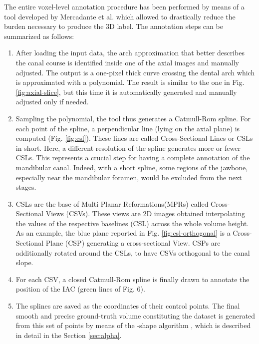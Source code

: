 The entire voxel-level annotation procedure has been performed by means of a
tool developed by Mercadante et al. \cite{mercadante2021cone} which allowed to
drastically reduce the burden necessary to produce the 3D label.
The annotation steps can be summarized as follows:
\begin{enumerate}
  \item{After loading the input data, the arch approximation that better
    describes the canal course is identified inside one of the axial images and
    manually adjusted. The output is a one-pixel thick curve crossing the dental
    arch which is approximated with a polynomial. The result is similar to the
    one in Fig. \ref{fig:axial-slice}, but this time it is automatically
    generated and manually adjusted only if needed.}

  \item{Sampling the polynomial, the tool thus generates a Catmull-Rom spline.
    For each point of the spline, a perpendicular line (lying on the axial
    plane) is computed (Fig. \ref{fig:csl}). These lines are called
    Cross-Sectional Lines or CSLs in short. Here, a different resolution of the
    spline generates more or fewer CSLs. This represents a crucial step for
    having a complete annotation of the mandibular canal. Indeed, with a short
    spline, some regions of the jawbone, especially near the mandibular foramen,
    would be excluded from the next stages.}

  \item{CSLs are the base of Multi Planar Reformations(MPRs) called
    Cross-Sectional Views (CSVs). These views are 2D images obtained
    interpolating the values of the respective baselines (CSL) across the whole
    volume height. As an example, the blue plane reported in Fig.
    \ref{fig:csl-orthogonal} is a Cross-Sectional Plane (CSP) generating a
    cross-sectional View. CSPs are additionally rotated around the CSLs, to have
    CSVs orthogonal to the canal slope.}

  \item{For each CSV, a closed Catmull-Rom spline is finally drawn to annotate
    the position of the IAC (green lines of Fig. 6).}

  \item{The splines are saved as the coordinates of their control points. The
    final smooth and precise ground-truth volume constituting the dataset is
    generated from this set of points by means of the \textalpha-shape algorithm
    \cite{edelsbrunner1983shape}, which is described in detail in the Section
    \ref{sec:alpha}.}
\end{enumerate}

